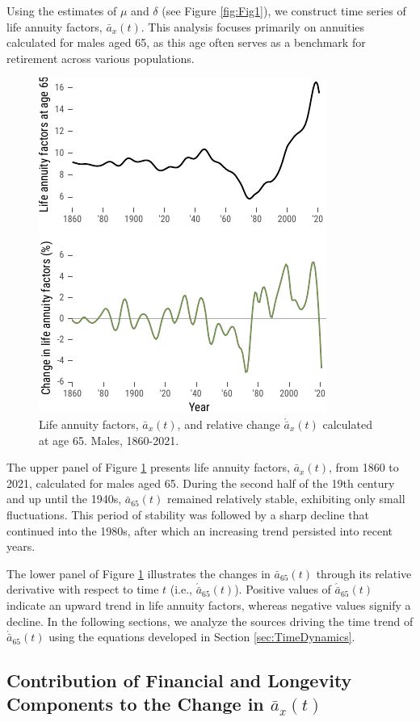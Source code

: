\documentclass[12pt]{article}
\begin{document}
{Using the estimates of \(\mu\) and \(\delta\) (see Figure \ref{fig:Fig1}), we construct time series of life annuity factors, \( \bar{a}_x(t) \). This analysis focuses primarily on annuities calculated for males aged 65, as this age often serves as a benchmark for retirement across various populations.

 \begin{figure}[H]
	\centering
	\includegraphics[width=0.5\linewidth]{Fig/lifeAnnuityFactorsAndChanges}
	\caption{{Life annuity factors, $\bar{a}_x(t)$, and relative change $\acute{\bar{a}}_x(t)$ calculated at age 65. Males, 1860-2021.}}
	\label{fig:Fig2}
\end{figure}


The upper panel of Figure \ref{fig:Fig2} presents life annuity factors, \( \bar{a}_x(t) \), from 1860 to 2021, calculated for males aged 65. During the second half of the 19th century and up until the 1940s, \( \bar{a}_{65}(t) \) remained relatively stable, exhibiting only small fluctuations. This period of stability was followed by a sharp decline that continued into the 1980s, after which an increasing trend persisted into recent years. 

The lower panel of Figure \ref{fig:Fig2} illustrates the changes in \( \bar{a}_{65}(t) \) through its relative derivative with respect to time \( t \) (i.e., \( \acute{\bar{a}}_{65}(t) \)). Positive values of \( \acute{\bar{a}}_{65}(t) \) indicate an upward trend in life annuity factors, whereas negative values signify a decline. In the following sections, we analyze the sources driving the time trend of \( \acute{\bar{a}}_{65}(t) \) using the equations developed in Section \ref{sec:TimeDynamics}.



\subsection{Contribution of Financial and Longevity Components to the Change in $\bar{a}_x(t)$}

}
\end{document}
